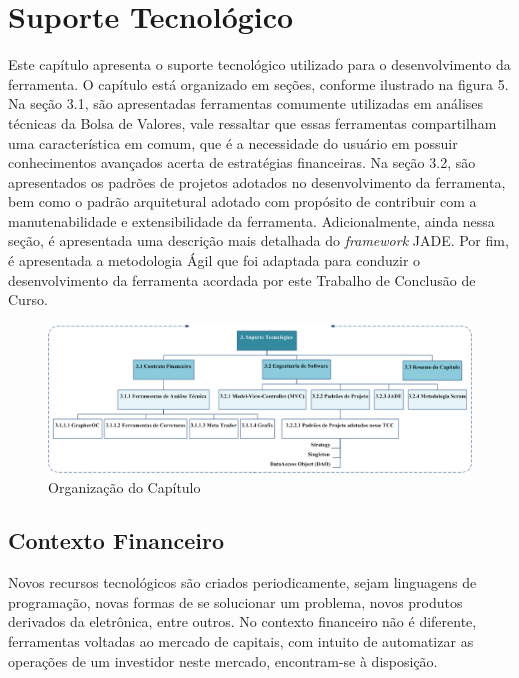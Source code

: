 \chapter[SUPORTE TECNOLÓGICO]{Suporte Tecnológico}

Este capítulo apresenta o suporte tecnológico utilizado para o desenvolvimento da ferramenta. O capítulo está organizado em seções, conforme ilustrado na figura 5. Na seção 3.1, são apresentadas ferramentas comumente utilizadas em análises técnicas da Bolsa de Valores, vale ressaltar que essas ferramentas compartilham uma característica em comum, que é a necessidade do usuário em possuir conhecimentos avançados acerta de estratégias financeiras. Na seção 3.2, são apresentados os padrões de projetos adotados no desenvolvimento da ferramenta, bem como o padrão arquitetural adotado com propósito de contribuir com a manutenabilidade e extensibilidade da ferramenta. Adicionalmente, ainda nessa seção, é apresentada uma descrição mais detalhada do \textit{framework} JADE. Por fim, é apresentada a metodologia Ágil que foi adaptada para conduzir o desenvolvimento da ferramenta acordada por este Trabalho de Conclusão de Curso.

\begin{figure}[h!]
\centering
\label{f10}
\includegraphics[width=1\textwidth]{figuras/cap3}
\caption{Organização do Capítulo}
\end{figure}
\FloatBarrier

\section{Contexto Financeiro}

Novos recursos tecnológicos são criados periodicamente, sejam linguagens de programação, novas formas de se solucionar um problema, novos produtos derivados da eletrônica, entre outros. No contexto financeiro não é diferente, ferramentas voltadas ao mercado de capitais, com intuito de automatizar as operações de um investidor neste mercado, encontram-se à disposição.

